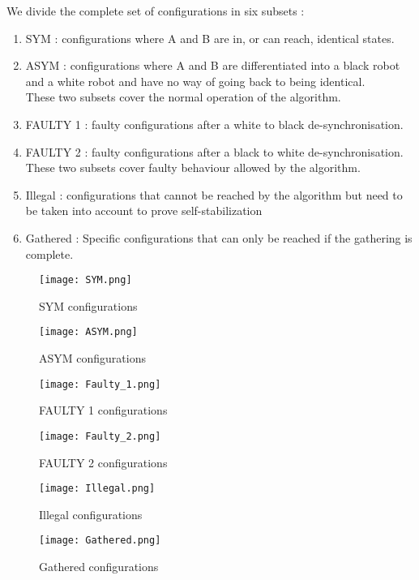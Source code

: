 \documentclass[11pt]{article}
\begin{document}
We divide the complete set of configurations in six subsets :

\begin{enumerate}[label=(\alph*)]
\item SYM : configurations where A and B are in, or can reach, identical states.
\item ASYM : configurations where A and B are differentiated into a black robot and a white robot and have no way of going back to being identical.\\

These two subsets cover the normal operation of the algorithm.

\item FAULTY 1 : faulty configurations after a white to black de-synchronisation.
\item FAULTY 2 : faulty configurations after a black to white de-synchronisation.\\

These two subsets cover faulty behaviour allowed by the algorithm.

\item Illegal : configurations that cannot be reached by the algorithm but need to be taken into account to prove self-stabilization
\item Gathered : Specific configurations that can only be reached if the gathering is complete.

\end{enumerate}

\begin{figure}[htb]
	\centering
	\texttt{[image: SYM.png]}
	\caption{SYM configurations}
\end{figure}

\begin{figure}[htb]
	\centering
	\texttt{[image: ASYM.png]}
	\caption{ASYM configurations}
\end{figure}

\begin{figure}[htb]
	\centering
	\texttt{[image: Faulty\_1.png]}
	\caption{FAULTY 1 configurations}
\end{figure}

\begin{figure}[htb]
	\centering
	\texttt{[image: Faulty\_2.png]}
	\caption{FAULTY 2 configurations}
\end{figure}

\begin{figure}[htb]
	\centering
	\texttt{[image: Illegal.png]}
	\caption{Illegal configurations}
\end{figure}

\begin{figure}[htb]
	\centering
	\texttt{[image: Gathered.png]}
	\caption{Gathered configurations}
\end{figure}
\end{document}
